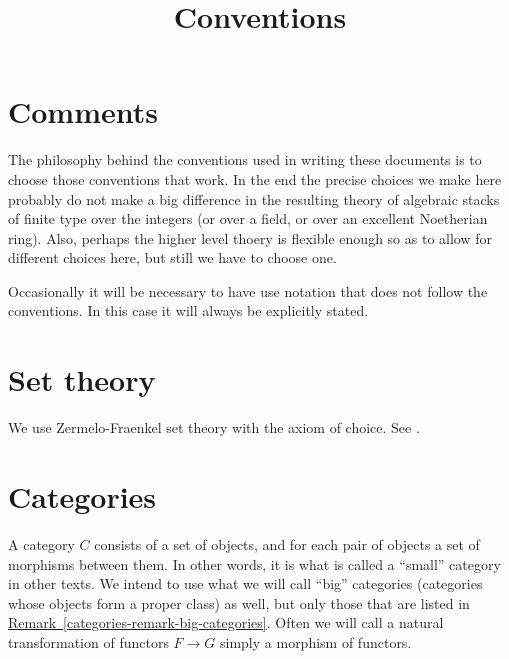 

%


\title{Conventions}


\maketitle

\tableofcontents

\section{Comments}
\label{section-comments}

\noindent
The philosophy behind the conventions used in writing these documents is
to choose those conventions that work. In the end the precise choices we 
make here probably do not make a big difference in the resulting theory 
of algebraic stacks of finite type over the integers (or over a field, 
or over an excellent Noetherian ring). Also, perhaps the higher level
thoery is flexible enough so as to allow for different choices here, but
still we have to choose one.

\smallskip\noindent
Occasionally it will be necessary to have use notation that does not follow 
the conventions. In this case it will always be explicitly stated.

\section{Set theory} 
\label{section-sets}

\noindent
We use Zermelo-Fraenkel set theory with the axiom of choice.
See \cite{Kunen}.

\section{Categories} 
\label{section-categories}

\noindent
A category $C$ consists of a set of objects, and for each pair of objects
a set of morphisms between them. In other words, it is what is called
a ``small'' category in other texts. We intend to use what we will
call ``big'' categories (categories whose objects form a proper class)
as well, but only those that are listed in
\hyperref[categories-remark-big-categories]%
{Remark~\ref*{categories-remark-big-categories}}. Often we will
call a natural transformation of functors $F \to G$ simply a morphism of
functors.

